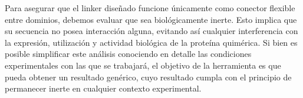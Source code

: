 Para asegurar que el linker diseñado funcione únicamente como conector flexible entre dominios, debemos evaluar que sea biológicamente inerte.
Esto implica que su secuencia no posea interacción alguna, evitando así cualquier interferencia con la expresión, utilización y actividad biológica de la proteína quimérica.
Si bien es posible simplificar este análisis conociendo en detalle las condiciones experimentales con las que se trabajará, el objetivo de la herramienta es que pueda obtener 
un resultado genérico, cuyo resultado cumpla con el principio de permanecer inerte en cualquier contexto experimental. 







